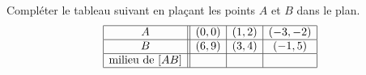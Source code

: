 
\begin{exercice}\label{exosmath-0019}

    Compléter le tableau suivant en plaçant les points \( A\) et \( B\) dans le plan.
    \begin{equation*}
        \begin{array}[]{|c||c|c|c|}
            \hline
            A&(0,0)&(1,2)&(-3,-2)\\
            \hline
            B&(6,9)&(3,4)&(-1,5)\\
            \hline
            \text{milieu de \( [AB]\)}&&&\\
            \hline
        \end{array}
    \end{equation*}

\end{exercice}
